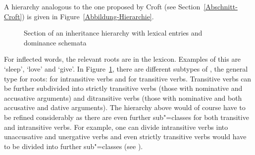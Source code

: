 A hierarchy analogous to the one proposed by Croft (see Section~\ref{Abschnitt-Croft}) is given in Figure~\vref{Abbildung-Hierarchie}.
\begin{figure}
\caption{\label{Abbildung-Hierarchie}Section of an inheritance hierarchy with lexical entries and dominance schemata}
\end{figure}%
For inflected words, the relevant roots are in the lexicon. Examples of this are  `sleep',  `love' and 
`give'. In Figure~\ref{Abbildung-Hierarchie}, there are different subtypes of , the
general type for roots: \eg {} for intransitive
verbs and  for transitive verbs. Transitive verbs can be further subdivided into strictly transitive verbs (those with nominative and accusative
arguments) and ditransitive verbs (those with nominative and both accusative and dative arguments). The hierarchy above would of course have to be refined considerably
as there are even further sub"=classes for both transitive and intransitive verbs. For example, one can divide intransitive verbs into unaccusative
and unergative verbs and even strictly transitive verbs would have to be divided into further sub"=classes (see \citealp[Section~2]{Welke2009a}).\pagebreak

